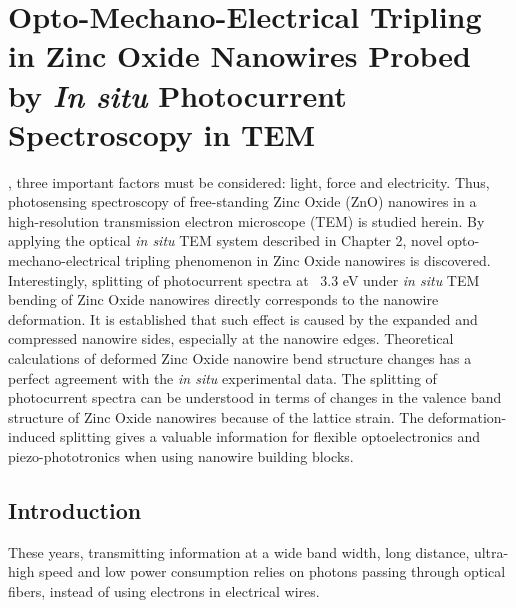 

\chapter{Opto-Mechano-Electrical Tripling in Zinc Oxide Nanowires Probed by \emph{In situ} Photocurrent Spectroscopy in TEM}

, three important factors must be considered: light, force and electricity. 
Thus, photosensing spectroscopy of free-standing Zinc Oxide (ZnO) nanowires in a high-resolution transmission electron microscope (TEM) is studied herein. 
By applying the optical {\em in situ} TEM system described in Chapter 2, novel opto-mechano-electrical tripling phenomenon in Zinc Oxide nanowires is discovered. 
Interestingly, splitting of photocurrent spectra at ~3.3 eV under {\em in situ} TEM bending of Zinc Oxide nanowires directly corresponds to the nanowire deformation. It is established that such effect is caused by the expanded and compressed nanowire sides, especially at the nanowire edges. 
Theoretical calculations of deformed Zinc Oxide nanowire bend structure changes has a perfect agreement with the {\em in situ} experimental data. 
The splitting of photocurrent spectra can be understood in terms of changes in the valence band structure of Zinc Oxide nanowires because of the lattice strain. 
The deformation-induced splitting gives a valuable information for flexible optoelectronics and piezo-phototronics when using nanowire building blocks. 

\section{Introduction}

These years, transmitting information at a wide band width, long distance, ultra-high speed and low power consumption relies on photons passing through optical fibers, instead of using electrons in electrical wires. 

